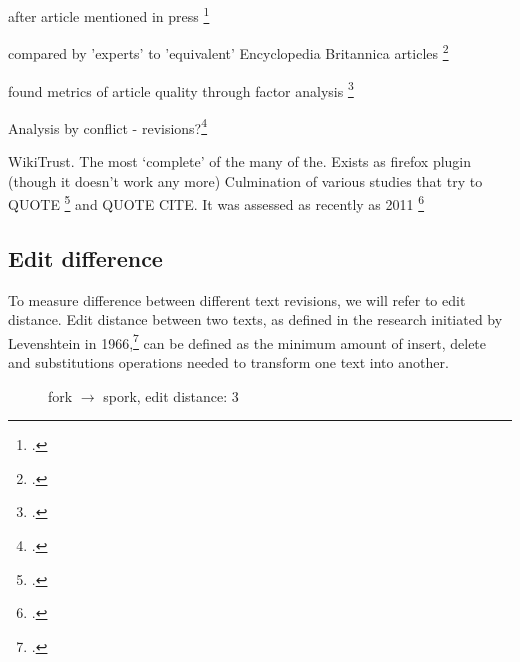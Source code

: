 \documentclass[a4paper,11pt,twoside,notitlepage]{article}
\newcommand\CellText[2]{%
          \node[texto,left=of mat#1,anchor=east]
          at (mat#1.west)
          {\large #2};
        }
\newcommand\SlText[2]{%
          \node[texto,left=of mat#1,anchor=west,rotate=50]
          at ([xshift=1.5ex,yshift=1ex]mat#1.north)
          {\large #2};
        }
\renewcommand{\cite}[1]{\footcite{#1}}
\begin{document}
        after article mentioned in press \cite{Lih2004}

        compared by 'experts' to 'equivalent' Encyclopedia Britannica articles \cite{Giles2005}

        found metrics of article quality through factor analysis
        \cite{Stvilia2005}

        Analysis by conflict - revisions?\cite{Kittur2007}

        WikiTrust. The most `complete' of the many of the. Exists as
        firefox plugin (though it doesn't work any more) Culmination
        of various studies that try to QUOTE \cite{Adler2007} and QUOTE CITE. It
        was assessed as recently as 2011 \cite{Lucassen2011}
       
        \subsection{Edit difference}
        To measure difference between different text revisions, we
        will refer to edit distance. Edit distance between two texts,
        as defined in the research initiated by Levenshtein in
        1966,\cite{Levenshtein1966} can be defined as the minimum
        amount of insert, delete and substitutions operations needed
        to transform one text into another.

        \begin{figure}[h]
          \centering
                  

          \vspace{3 mm}

          fork $\rightarrow$ spork, edit distance: 3
          
          
          \label{fig:fork-spork}
        \end{figure}
\end{document}
